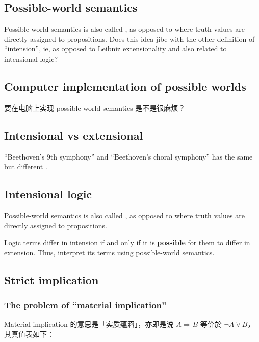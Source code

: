 \subsection{Possible-world semantics}

Possible-world semantics is also called , as opposed to  where truth values are directly assigned to propositions.  Does this idea jibe with the other definition of ``intension'', ie, as opposed to Leibniz extensionality and also related to intensional logic?

\subsection{Computer implementation of possible worlds}

要在电脑上实现 possible-world semantics 是不是很麻烦？

\subsection{Intensional vs extensional}

``Beethoven's 9th symphony'' and ``Beethoven's choral symphony'' has the same  but different .

\subsection{Intensional logic}

Possible-world semantics is also called , as opposed to  where truth values are directly assigned to propositions.

Logic terms differ in intension if and only if it is \textbf{possible} for them to differ in extension.  Thus,  interpret its terms using possible-world semantics.

\subsection{Strict implication}
\label{sec:strict-implication}

\subsubsection{The problem of ``material implication''}

Material implication 的意思是「实质蕴涵」，亦即是说 $A \Rightarrow B$ 等价於 $\neg A \vee B$，其真值表如下：

